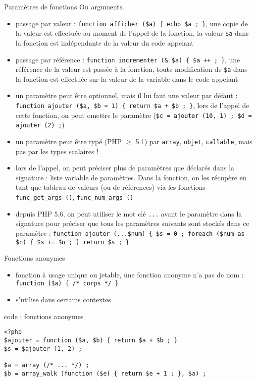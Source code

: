 \begin{frame}[containsverbatim]{Paramètres de fonctions}
	Ou arguments.
	\begin{itemize}
		\item passage par valeur : \lstinline!function afficher ($a) { echo $a ; }!, une copie de la valeur est effectuée au moment de l'appel de la fonction, la valeur \texttt{\$a} dans la fonction est indépendante de la valeur du code appelant
		\item passage par référence : \lstinline!function incrementer (& $a) { $a ++ ; }!, une référence de la valeur est passée à la fonction, toute modification de \texttt{\$a} dans la fonction est effectuée sur la valeur de la variable dans le code appelant
		\item un paramètre peut être optionnel, mais il lui faut une valeur par défaut : \lstinline!function ajouter ($a, $b = 1) { return $a + $b ; }!, lors de l'appel de cette fonction, on peut omettre le paramètre (\lstinline!$c = ajouter (10, 1) ; $d = ajouter (2) ;!)
		\item un paramètre peut être typé (PHP $\ge$ 5.1) par \texttt{array}, \texttt{objet}, \texttt{callable}, mais pas par les types scalaires !
		\item lors de l'appel, on peut préciser plus de paramètres que déclarés dans la signature : liste variable de paramètres. Dans la fonction, on les récupère en tant que tableau de valeurs (ou de références) via les fonctions \texttt{func\_get\_args ()}, \texttt{func\_num\_args ()}
		\item depuis PHP 5.6, on peut utiliser le mot clé \texttt{...} avant le paramètre dans la signature pour préciser que tous les paramètres suivants sont stockés dans ce paramètre : \lstinline!function ajouter (...$num) { $s = 0 ; foreach ($num as $n) { $s += $n ; } return $s ; }! 
	\end{itemize}
\end{frame}

\begin{frame}[containsverbatim]{Fonctions anonymes} %
	\begin{itemize}
		\item fonction à usage unique ou jetable, une fonction anonyme n'a pas de nom : \lstinline!function ($a) { /* corps */ }!
		\item s'utilise dans certains contextes
	\end{itemize}
	\begin{block}{code : fonctions anonymes}
		\begin{lstlisting}
<?php
$ajouter = function ($a, $b) { return $a + $b ; }
$s = $ajouter (1, 2) ;

$a = array (/* ... */) ;
$b = array_walk (function ($e) { return $e + 1 ; }, $a) ;
		\end{lstlisting}
	\end{block}
\end{frame}


